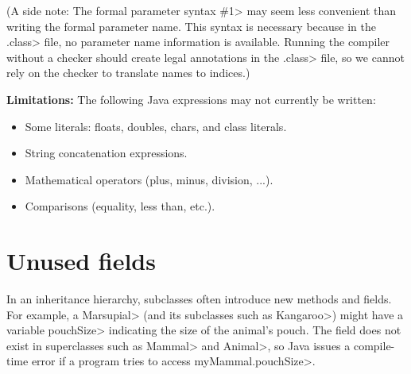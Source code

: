 
(A side note:  The formal parameter syntax \<\#1> may seem less convenient
than writing the formal parameter name.  This syntax is necessary because
in the \<.class> file, no parameter name information is available.  Running
the compiler without a checker should create legal annotations in the
\<.class> file, so we cannot rely on the checker to translate names to
indices.)


\textbf{Limitations:}
The following Java expressions may not currently be written:
\begin{itemize}
\item Some literals:  floats, doubles, chars, and class literals.
\item String concatenation expressions.
\item Mathematical operators (plus, minus, division, ...).
\item Comparisons (equality, less than, etc.).
\end{itemize}



\section{Unused fields\label{unused-fields}}

In an inheritance hierarchy, subclasses often introduce new methods and
fields.  For example, a \<Marsupial> (and its subclasses such as
\<Kangaroo>) might have a variable \<pouchSize> indicating the size of the animal's
pouch.  The field does not exist in superclasses such as
\<Mammal> and \<Animal>, so Java issues a compile-time
error if a program tries to access \<myMammal.pouchSize>.

